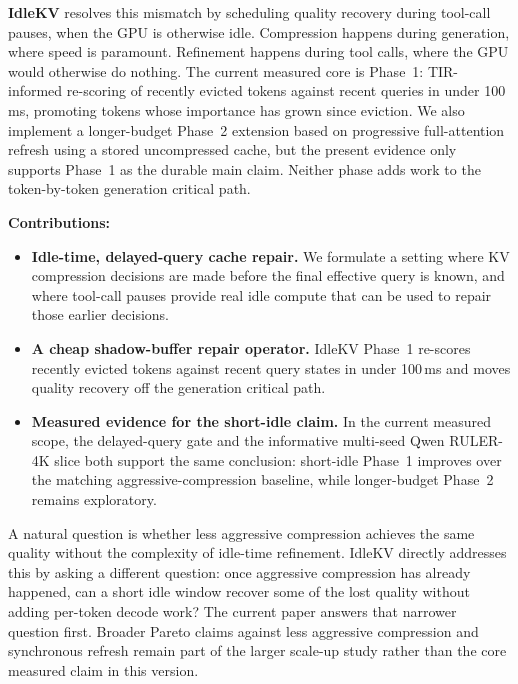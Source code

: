 \documentclass[10pt,twocolumn,letterpaper]{article}
\begin{document}
\textbf{IdleKV} resolves this mismatch by scheduling quality recovery during
tool-call pauses, when the GPU is otherwise idle.
Compression happens during generation, where speed is paramount.
Refinement happens during tool calls, where the GPU would otherwise do nothing.
The current measured core is Phase~1: TIR-informed re-scoring of recently
evicted tokens against recent queries in under 100\,ms, promoting tokens whose
importance has grown since eviction.
We also implement a longer-budget Phase~2 extension based on progressive
full-attention refresh using a stored uncompressed cache, but the present
evidence only supports Phase~1 as the durable main claim.
Neither phase adds work to the token-by-token generation critical path.

\textbf{Contributions:}
\begin{itemize}
\item \textbf{Idle-time, delayed-query cache repair.}
  We formulate a setting where KV compression decisions are made before the
  final effective query is known, and where tool-call pauses provide real idle
  compute that can be used to repair those earlier decisions.
\item \textbf{A cheap shadow-buffer repair operator.}
  IdleKV Phase~1 re-scores recently evicted tokens against recent query states
  in under 100\,ms and moves quality recovery off the generation critical path.
\item \textbf{Measured evidence for the short-idle claim.}
  In the current measured scope, the delayed-query gate and the informative
  multi-seed Qwen RULER-4K slice both support the same conclusion:
  short-idle Phase~1 improves over the matching aggressive-compression
  baseline, while longer-budget Phase~2 remains exploratory.
\end{itemize}

A natural question is whether less aggressive compression achieves the same
quality without the complexity of idle-time refinement.
IdleKV directly addresses this by asking a different question:
once aggressive compression has already happened, can a short idle window
recover some of the lost quality without adding per-token decode work?
The current paper answers that narrower question first.
Broader Pareto claims against less aggressive compression and synchronous
refresh remain part of the larger scale-up study rather than the core measured
claim in this version.

%
\end{document}

